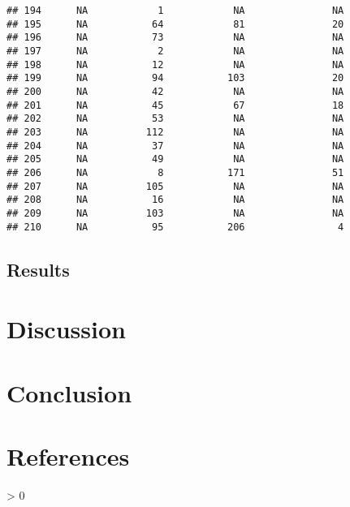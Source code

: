 \documentclass[
  english,
  man]{apa6}
\newlength{\cslhangindent}
\newenvironment{CSLReferences}[2] %
 {%
  \setlength{\parindent}{0pt}
  \ifodd #1 \everypar{\setlength{\hangindent}{\cslhangindent}}\ignorespaces\fi
  \ifnum #2 > 0
  \setlength{\parskip}{#2\baselineskip}
  \fi
 }%
 {}
\begin{document}
\begin{verbatim}
## 194      NA            1            NA               NA
## 195      NA           64            81               20
## 196      NA           73            NA               NA
## 197      NA            2            NA               NA
## 198      NA           12            NA               NA
## 199      NA           94           103               20
## 200      NA           42            NA               NA
## 201      NA           45            67               18
## 202      NA           53            NA               NA
## 203      NA          112            NA               NA
## 204      NA           37            NA               NA
## 205      NA           49            NA               NA
## 206      NA            8           171               51
## 207      NA          105            NA               NA
## 208      NA           16            NA               NA
## 209      NA          103            NA               NA
## 210      NA           95           206                4
\end{verbatim}

\hypertarget{results-1}{%
\subsection{Results}\label{results-1}}

\hypertarget{discussion}{%
\section{Discussion}\label{discussion}}

\hypertarget{conclusion}{%
\section{Conclusion}\label{conclusion}}

\newpage

\hypertarget{references}{%
\section{References}\label{references}}

\begingroup
\setlength{\parindent}{-0.5in}
\setlength{\leftskip}{0.5in}

\hypertarget{refs}{}
\begin{CSLReferences}{0}{0}
\end{CSLReferences}

\endgroup
\end{document}
